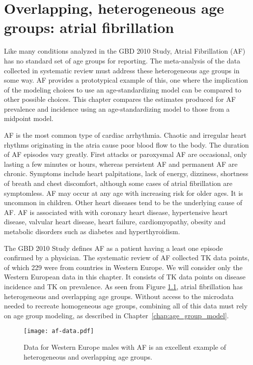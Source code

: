 \chapter{Overlapping, heterogeneous age groups: atrial fibrillation}
\label{applications-age_groups}

Like many conditions analyzed in the GBD 2010 Study, Atrial
Fibrillation (AF) has no standard set of age groups for reporting.  The
meta-analysis of the data collected in systematic review must address
these heterogeneous age groups in some way. AF provides a prototypical
example of this, one where the implication of the modeling choices to
use an age-standardizing model can be compared to other possible
choices.  This chapter compares the estimates produced for AF
prevalence and incidence using an age-standardizing model to those
from a midpoint model.

AF is the most common type of cardiac arrhythmia.  Chaotic and
irregular heart rhythms originating in the atria cause poor blood flow
to the body.  The duration of AF episodes vary greatly.  First attacks
or paroxysmal AF are occasional, only lasting a few minutes or hours,
whereas persistent AF and permanent AF are chronic.  Symptoms include
heart palpitations, lack of energy, dizziness, shortness of breath and
chest discomfort, although some cases of atrial fibrillation are
symptomless.  AF may occur at any age with increasing risk for older
ages.  It is uncommon in children.  Other heart diseases tend to be
the underlying cause of AF.  AF is associated with with coronary heart
disease, hypertensive heart disease, valvular heart disease, heart
failure, cardiomyopathy, obesity and metabolic disorders such as
diabetes and hyperthyroidism. \cite{rich_epidemiology_2009,
  rho_asymptomatic_2005, fuster_acc/aha/esc_2006, radford_atrial_1977,
  TK_ref_from_Mehrdad}

The GBD 2010 Study defines AF as a patient having a least one episode
confirmed by a physician.  The systematic review of AF collected TK
data points, of which 229 were from countries in Western Europe.  We
will consider only the Western European data in this chapter. It
consists of TK data points on disease incidence and TK on prevalence.
As seen from Figure \ref{fig:app-af data}, atrial fibrillation has
heterogeneous and overlapping age groups.  Without access to the
microdata needed to recreate homogeneous age groups, combining all of
this data must rely on age group modeling, as described in
Chapter~\ref{chap:age_group_model}.

    \begin{figure}[h]
        \begin{center}
            \texttt{[image: af-data.pdf]}
            \caption{Data for Western Europe males with 
              AF is an excellent example of heterogeneous
              and overlapping age groups.}
            \label{fig:app-af data}
        \end{center}
    \end{figure}

